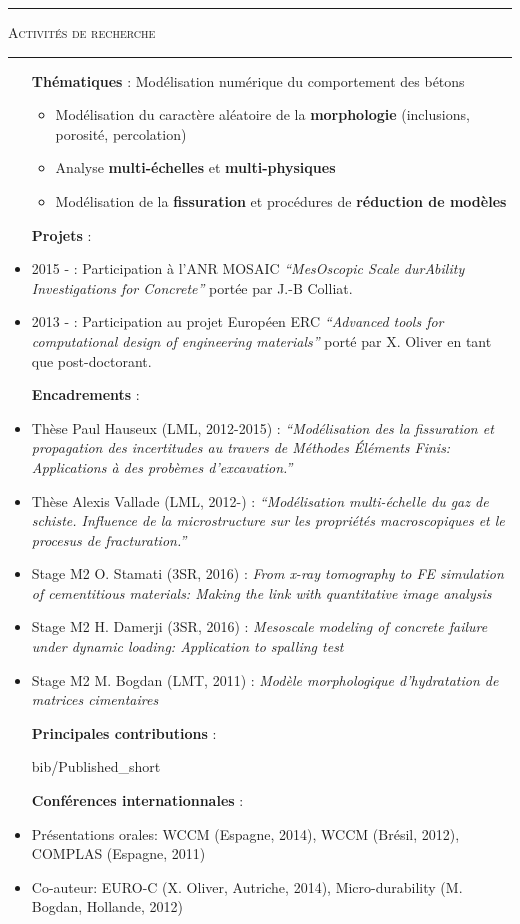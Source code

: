 \documentclass[a4paper,11pt]{article}
\newcommand{\titre}[1]{
  \begin{center}
    \rule{0.4\textwidth}{0.5pt}
    \par\vspace{0.1cm}
    \textsc{\large #1}
    \par\vspace{-0.2cm}
    \par\noindent\rule{0.4\textwidth}{0.5pt}
  \end{center}
}
\begin{document}
\newpage
\titre{Activités de recherche}
\begin{itemize}
  \item[\textbf{Thématiques}] : Modélisation numérique du comportement des bétons
    \begin{itemize}
    \item Modélisation du caractère aléatoire de la \textbf{morphologie} (inclusions, porosité, percolation)
    \item Analyse \textbf{multi-échelles} et \textbf{multi-physiques}
    \item Modélisation de la \textbf{fissuration} et procédures de \textbf{réduction de modèles}
    \end{itemize}
  \item[\textbf{Projets}] :
  \item 2015 - : Participation à l'ANR MOSAIC \textit{``MesOscopic Scale durAbility Investigations for Concrete''} portée par J.-B Colliat.
  \item 2013 - : Participation au projet Européen ERC \textit{``Advanced tools for computational design of engineering materials''} porté par X. Oliver en tant que post-doctorant.
  \item[\textbf{Encadrements}] :
  \item Thèse Paul Hauseux (LML, 2012-2015) : \textit{``Modélisation des la fissuration et propagation des incertitudes au travers de Méthodes Éléments Finis: Applications à des probèmes d'excavation.''}
  \item Thèse Alexis Vallade (LML, 2012-) : \textit{``Modélisation multi-échelle du gaz de schiste. Influence de la microstructure sur les propriétés macroscopiques et le procesus de fracturation.''}
  \item Stage M2 O. Stamati (3SR, 2016) : \textit{From x-ray tomography to FE simulation of cementitious materials: Making the link with quantitative image analysis}
  \item Stage M2 H. Damerji (3SR, 2016) : \textit{Mesoscale modeling of concrete failure under dynamic loading: Application to spalling test}
  \item Stage M2 M. Bogdan (LMT, 2011) : \textit{Modèle morphologique d'hydratation de matrices cimentaires} 
  \item[\textbf{Principales contributions}] :
    \begin{btSect}{bib/Published_short}
      \btPrintAll
    \end{btSect}
  \item[\textbf{Conférences internationnales}] : 
  \item Présentations orales: WCCM (Espagne, 2014), WCCM (Brésil, 2012), COMPLAS (Espagne, 2011)
  \item Co-auteur: EURO-C (X. Oliver, Autriche, 2014), Micro-durability (M. Bogdan, Hollande, 2012)
\end{itemize}
\vfill
\end{document}
